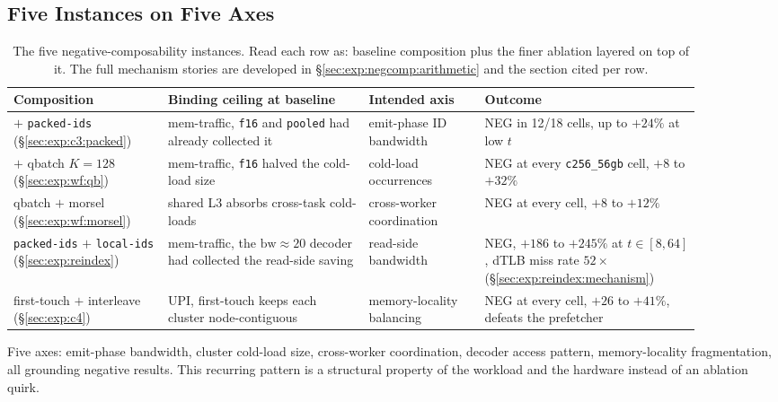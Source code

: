 \subsection{Five Instances on Five Axes\label{sec:exp:negcomp:instances}}

\begin{table}[H]
  \centering
  \caption[The five negative-composability instances.]{The five negative-composability instances. Read each row as: baseline composition plus the finer ablation layered on top of it. The full mechanism stories are developed in §\ref{sec:exp:negcomp:arithmetic} and the section cited per row.}
  \label{tab:negcomp}
  \footnotesize
  \begin{tabular}{>{\raggedright\arraybackslash}p{0.20\linewidth}>{\raggedright\arraybackslash}p{0.26\linewidth}>{\raggedright\arraybackslash}p{0.15\linewidth}>{\raggedright\arraybackslash}p{0.28\linewidth}}
    \toprule
    Composition & Binding ceiling at baseline & Intended axis & Outcome \\
    \midrule
    \bcombo{} $+$ \texttt{packed-ids} (§\ref{sec:exp:c3:packed}) & mem-traffic, \texttt{f16} and \texttt{pooled} had already collected it & emit-phase ID bandwidth & NEG in 12/18 cells, up to $+24\%$ at low $t$ \\
    \bcombo{} $+$ qbatch $K{=}128$ (§\ref{sec:exp:wf:qb}) & mem-traffic, \texttt{f16} halved the cold-load size & cold-load occurrences & NEG at every \texttt{c256\_56gb} cell, $+8$ to $+32\%$ \\
    qbatch $+$ morsel (§\ref{sec:exp:wf:morsel}) & shared L3 absorbs cross-task cold-loads & cross-worker coordination & NEG at every cell, $+8$ to $+12\%$ \\
    \texttt{packed-ids} $+$ \texttt{local-ids} (§\ref{sec:exp:reindex}) & mem-traffic, the $\text{bw}{\approx}20$ decoder had collected the read-side saving & read-side bandwidth & NEG, $+186$ to $+245\%$ at $t \in [8,64]$, dTLB miss rate $52\times$ (§\ref{sec:exp:reindex:mechanism}) \\
    first-touch $+$ interleave (§\ref{sec:exp:c4}) & UPI, first-touch keeps each cluster node-contiguous & memory-locality balancing & NEG at every cell, $+26$ to $+41\%$, defeats the prefetcher \\
    \bottomrule
  \end{tabular}
\end{table}

Five axes: emit-phase bandwidth, cluster cold-load size, cross-worker coordination, decoder access pattern, memory-locality fragmentation, all grounding negative results. This recurring pattern is a structural property of the workload and the hardware instead of an ablation quirk.

